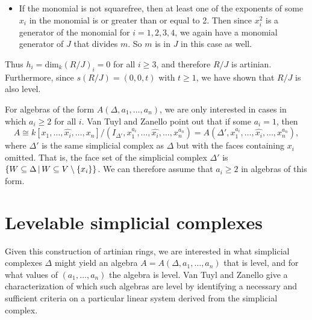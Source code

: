 \begin{enumerate}
\begin{itemize}
        \item If the monomial is not squarefree, then at least one of the exponents of some $x_i$ in the monomial is or greater than or equal to 2. Then since $x_i^2$ is a generator of the monomial for $i = 1, 2, 3, 4$, we again have a monomial generator of $J$ that divides $m$. So $m$ is in $J$ in this case as well.
    \end{itemize}
    Thus $h_i = \textrm{dim}_k (R/J)_i = 0$ for all $i \geq 3$, and therefore $R/J$ is artinian. Furthermore, since $s(R/J) = (0, 0, t)$ with $t \geq 1$, we have shown that $R/J$ is also level.
\end{enumerate}

For algebras of the form $A(\Delta, a_1, \dots, a_n)$, we are only interested in cases in which $a_i \geq 2$ for all $i$. Van Tuyl and Zanello \cite{VanTuyl2010} point out that if some $a_i =1$, then
$$
A \cong k[x_1, \dots, \hat{x_i} , \dots , x_n] / (I_{\Delta '}, x_1^{a_i},\dots, \hat{x_i}, \dots , x_n^{a_n} ) = A(\Delta ' , x_1^{a_i},\dots, \hat{x_i}, \dots , x_n^{a_n} ),
$$
where $\Delta' $ is the same simplicial complex as $\Delta$ but with the faces containing $x_i$ omitted. That is, the face set of the simplicial complex $\Delta'$ is $\{ W \subseteq \Delta \, | \, W \subseteq V \setminus \{ x_i \} \}$. We can therefore assume that $a_i \geq 2$ in algebras of this form.

\section{Levelable simplicial complexes} \label{sec:levelable}

Given this construction of artinian rings, we are interested in what simplicial complexes $\Delta$ might yield an algebra $A = A(\Delta, a_1, \dots, a_n)$ that is level, and for what values of $(a_1, \dots, a_n)$ the algebra is level. Van Tuyl and Zanello \cite{VanTuyl2010} give a characterization of which such algebras are level by identifying a necessary and sufficient criteria on a particular linear system derived from the simplicial complex.

